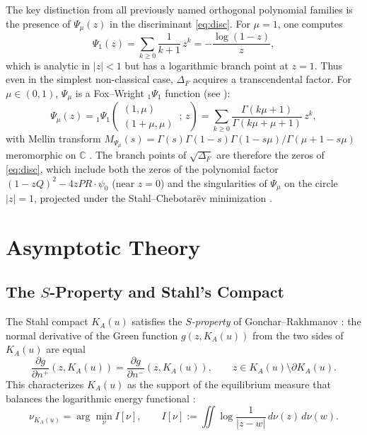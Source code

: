 \documentclass{article}
\newcommand{\C}{\mathbb{C}}
\begin{document}
The key distinction from all previously named orthogonal polynomial families
is the presence of $\Psi_\mu(z)$ in the discriminant \eqref{eq:disc}. For
$\mu = 1$, one computes
\begin{equation}\label{eq:Psi1}
  \Psi_1(z) = \sum_{k\ge 0} \frac{1}{k+1}\,z^k = -\frac{\log(1-z)}{z},
\end{equation}
which is analytic in $|z| < 1$ but has a logarithmic branch point at $z=1$.
Thus even in the simplest non-classical case, $\Delta_F$ acquires a
transcendental factor. For $\mu \in (0,1)$, $\Psi_\mu$ is a Fox--Wright
${}_1\Psi_1$ function (see \cite{Wright1935,Gorenflo2014}):
\begin{equation}\label{eq:fox_wright_explicit}
  \Psi_\mu(z) = {}_1\Psi_1\!\left(\begin{matrix}(1,\mu)\\(1+\mu,\mu)\end{matrix}\,;\,z\right)
  = \sum_{k\ge 0}\frac{\Gamma(k\mu+1)}{\Gamma(k\mu+\mu+1)}\,z^k,
\end{equation}
with Mellin transform $M_{\Psi_\mu}(s) =
\Gamma(s)\Gamma(1-s)\Gamma(1-s\mu)/\Gamma(\mu{+}1-s\mu)$ meromorphic on $\C$
\cite{Crowley2026}. The branch points of $\sqrt{\Delta_F}$ are therefore the
zeros of \eqref{eq:disc}, which include both the zeros of the polynomial factor
$(1-zQ)^2 - 4zPR\cdot\psi_0$ (near $z=0$) and the singularities of
$\Psi_\mu$ on the circle $|z|=1$, projected under the Stahl--Chebotarëv
minimization \cite{Stahl1985I,Stahl1985II}.

\section{Asymptotic Theory}

\subsection{The $S$-Property and Stahl's Compact}

The Stahl compact $K_A(u)$ satisfies the \emph{$S$-property} of
Gonchar--Rakhmanov \cite{GoncharRakhmanov1987}: the normal derivative of
the Green function $g(z, K_A(u))$ from the two sides of $K_A(u)$ are equal
\begin{equation}\label{eq:S_property}
  \frac{\partial g}{\partial n^+}(z, K_A(u)) = \frac{\partial g}{\partial n^-}(z, K_A(u)),
  \qquad z \in K_A(u) \setminus \partial K_A(u).
\end{equation}
This characterizes $K_A(u)$ as the support of the equilibrium measure that
balances the logarithmic energy functional \cite{Ransford1995}:
\begin{equation}\label{eq:equil_meas}
  \nu_{K_A(u)} = \arg\min_\nu I[\nu], \qquad
  I[\nu] := \iint \log\frac{1}{|z-w|}\,d\nu(z)\,d\nu(w).
\end{equation}
\end{document}
